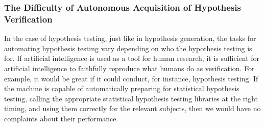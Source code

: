 \documentclass{book}
\begin{document}






\subsubsection{The Difficulty of Autonomous Acquisition of Hypothesis Verification}
In the case of hypothesis testing, just like in hypothesis generation, the tasks for automating hypothesis testing vary depending on who the hypothesis testing is for. If artificial intelligence is used as a tool for human research, it is sufficient for artificial intelligence to faithfully reproduce what humans do as verification. For example, it would be great if it could conduct, for instance, hypothesis testing. If the machine is capable of automatically preparing for statistical hypothesis testing, calling the appropriate statistical hypothesis testing libraries at the right timing, and using them correctly for the relevant subjects, then we would have no complaints about their performance.
\end{document}
